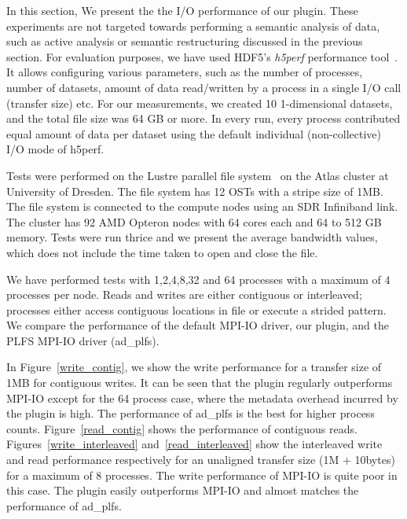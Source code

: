 In this section, We present the the I/O performance of our plugin. These experiments are not targeted towards performing a semantic analysis of data, such as active analysis or semantic restructuring discussed in the previous section.
For evaluation purposes, we have used HDF5's \textit{h5perf} performance tool~\cite{h5perf}. It allows configuring various parameters, such as the number of processes, number of datasets, amount of data read/written by a process in a single I/O call (transfer size) etc. For our measurements, we created 10 1-dimensional datasets, and the total file size was 64 GB or more.
In every run, every process contributed equal amount of data per dataset using the default individual (non-collective) I/O mode of h5perf.

Tests were performed on the Lustre parallel file system~\cite{lustre} on the Atlas cluster at University of Dresden. The file system has 12 OSTs with a stripe size of 1MB. The file system is connected to the compute nodes using an SDR Infiniband link. The cluster has 92 AMD Opteron nodes with 64 cores each and 64 to 512 GB memory. Tests were run thrice and we present the average bandwidth values, which does not include the time taken to open and close the file.

We have performed tests with 1,2,4,8,32 and 64 processes with a maximum of 4 processes per node.
Reads and writes are either contiguous or interleaved; processes either access contiguous locations in file or execute a strided pattern.
We compare the performance of the default MPI-IO driver, our plugin, and the PLFS MPI-IO driver (ad\_plfs). 

In Figure~\ref{write_contig}, we show the write performance for a transfer size of 1MB for contiguous writes. It can be seen that the plugin regularly outperforms MPI-IO except for the 64 process case, where the metadata overhead incurred by the plugin is high. The performance  of ad\_plfs is the best for higher process counts. Figure~\ref{read_contig} shows the performance of contiguous reads. 
Figures~\ref{write_interleaved} and~\ref{read_interleaved} show the interleaved write and read performance respectively for an unaligned transfer size (1M + 10bytes) for a maximum of 8 processes. The write performance of MPI-IO is quite poor in this case. The plugin easily outperforms MPI-IO and almost matches the performance of ad\_plfs. 

